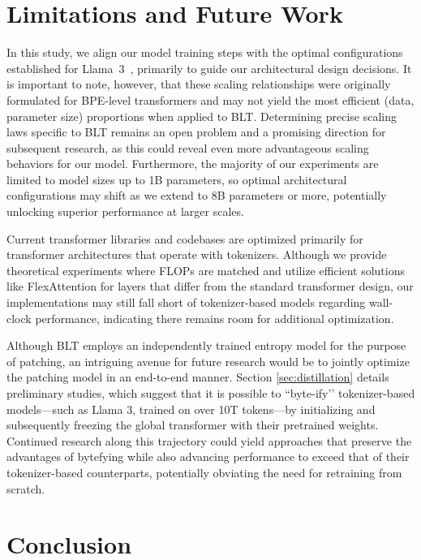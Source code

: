 \section{Limitations and Future Work}

In this study, we align our model training steps with the optimal configurations established for Llama~3~\citep{dubey2024llama}, primarily to guide our architectural design decisions. It is important to note, however, that these scaling relationships were originally formulated for BPE-level transformers and may not yield the most efficient (data, parameter size) proportions when applied to {\textsc BLT}. Determining precise scaling laws specific to {\textsc BLT} remains an open problem and a promising direction for subsequent research, as this could reveal even more advantageous scaling behaviors for our model. Furthermore, the majority of our experiments are limited to model sizes up to 1B parameters, so optimal architectural configurations may shift as we extend to 8B parameters or more, potentially unlocking superior performance at larger scales.

Current transformer libraries and codebases are optimized primarily for transformer architectures that operate with tokenizers. Although we provide theoretical experiments where FLOPs are matched and utilize efficient solutions like FlexAttention for layers that differ from the standard transformer design, our implementations may still fall short of tokenizer-based models regarding wall-clock performance, indicating there remains room for additional optimization.

Although {\textsc BLT} employs an independently trained entropy model for the purpose of patching, an intriguing avenue for future research would be to jointly optimize the patching model in an end-to-end manner. Section \ref{sec:distillation} details preliminary studies, which suggest that it is possible to ``byte-ify’’ tokenizer-based models—such as Llama 3, trained on over 10T tokens—by initializing and subsequently freezing the global transformer with their pretrained weights. Continued research along this trajectory could yield approaches that preserve the advantages of bytefying while also advancing performance to exceed that of their tokenizer-based counterparts, potentially obviating the need for retraining from scratch.

\section{Conclusion}
\label{section:conclusion}

